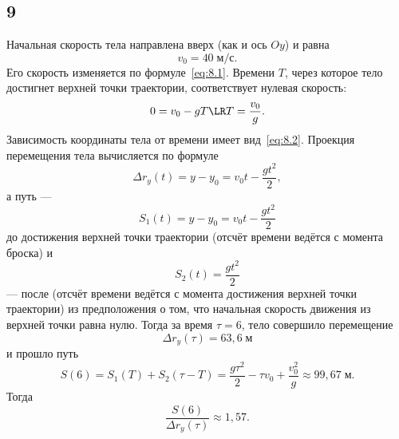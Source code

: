 \subsection{9}

Начальная скорость тела направлена вверх (как и ось $Oy$) и равна
\[
v_0=40\;\text{м/с}.
\]
Его скорость изменяется по формуле~\eqref{eq:8.1}. Времени $T$, через которое тело достигнет верхней точки траектории, соответствует нулевая скорость:
\begin{equation}\label{eq:9.1}
0=v_0-gT\LR T=\frac{v_0}{g}.
\end{equation}
Зависимость координаты тела от времени имеет вид~\eqref{eq:8.2}. Проекция перемещения тела вычисляется по формуле
\[
\Delta r_y(t)=y-y_0=v_0t-\frac{gt^2}{2},
\]
а путь ---
\[
S_1(t)=y-y_0=v_0t-\frac{gt^2}{2}
\]
до достижения верхней точки траектории (отсчёт времени ведётся с момента броска) и
\[
S_2(t)=\frac{gt^2}{2}
\]
--- после (отсчёт времени ведётся с момента достижения верхней точки траектории) из предположения о том, что начальная скорость движения из верхней точки равна нулю. Тогда за время $\tau=6$, тело совершило перемещение
\[
\Delta r_y(\tau)=63{,}6\;\text{м}
\]
и прошло путь
\[
S(6)=S_1(T)+S_2(\tau-T)=\frac{g\tau^2}{2}-\tau v_0+\frac{v_0^2}{g}\approx99{,}67\;\text{м}.
\]
Тогда
\[
\frac{S(6)}{\Delta r_y(\tau)}\approx1{,}57.
\]